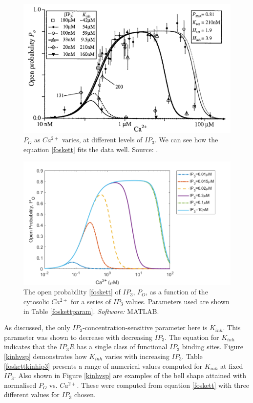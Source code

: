 \begin{figure}[h!!!t!!!b!!!p]
  \centering
  \includegraphics[width=1\linewidth]{Chapters/3_IP3R_dynamics/extras/fig2foskett.png}
  \caption{$P_O$ as $Ca^{2+}$ varies, at different levels of $IP_3$. We can see how the equation \eqref{foskett} fits the data well. Source: . }\label{foskettfig2}
\end{figure}

\begin{figure}[h!!!t!!!b!!!p]
  \centering
  \includegraphics[width=1\linewidth]{Chapters/3_IP3R_dynamics/extras/fosketthillfunction.png}
  \caption{The open probability \eqref{foskett} of $IP_3$, $P_O$, as a function of the cytosolic $Ca^{2+}$ for a series of $IP_3$ values. Parameters used are shown in Table \ref{foskettparam}. \textit{Software:} MATLAB.}\label{foskettcurve}
\end{figure}

As discussed, the only $IP_3$-concentration-sensitive parameter here is $K_{inh}$. This parameter was shown to decrease with decreasing $IP_3$. The equation for $K_{inh}$ indicates that the $IP_3R$ has a single class of functional $IP_3$ binding sites. Figure \ref{kinhvsp} demonstrates how $K_{inh}$ varies with increasing $IP_3$. Table \ref{foskettkinhip3} presents a range of numerical values computed for $K_{inh}$ at fixed $IP_3$. Also shown in Figure \ref{kinhvsp} are examples of the bell shape attained with normalised $P_O$ vs. $Ca^{2+}$. These were computed from equation \eqref{foskett} with three different values for $IP_3$ chosen.

